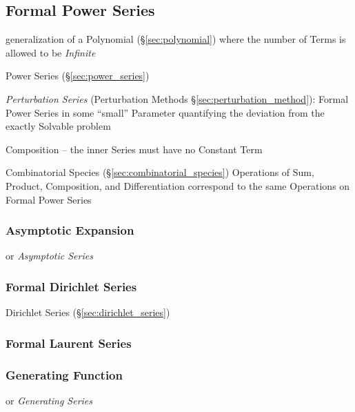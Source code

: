 \subsection{Formal Power Series}\label{sec:formal_power_series}

generalization of a Polynomial (\S\ref{sec:polynomial}) where the number of
Terms is allowed to be \emph{Infinite}

\fist Power Series (\S\ref{sec:power_series})

\fist \emph{Perturbation Series} (Perturbation Methods
\S\ref{sec:perturbation_method}): Formal Power Series in some ``small''
Parameter quantifying the deviation from the exactly Solvable problem

Composition -- the inner Series must have no Constant Term

Combinatorial Species (\S\ref{sec:combinatorial_species}) Operations of Sum,
Product, Composition, and Differentiation correspond to the same Operations on
Formal Power Series



\subsubsection{Asymptotic Expansion}\label{sec:asymptotic_expansion}

or \emph{Asymptotic Series}



\subsubsection{Formal Dirichlet Series}\label{sec:formal_dirichlet_series}

Dirichlet Series (\S\ref{sec:dirichlet_series})



\subsubsection{Formal Laurent Series}\label{sec:formal_laurent}

\subsubsection{Generating Function}\label{sec:generating_function}

or \emph{Generating Series}

